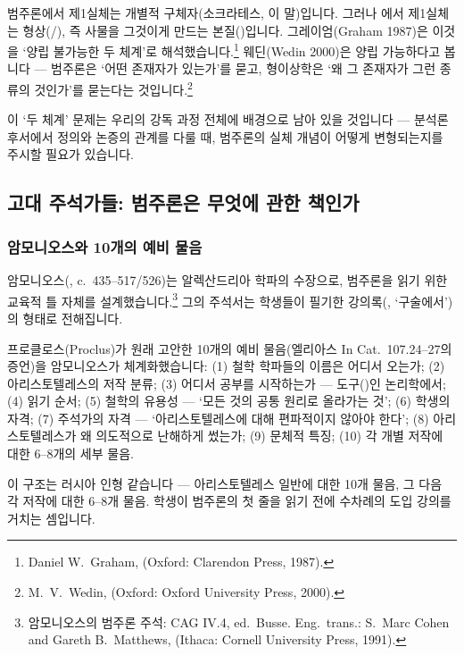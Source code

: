 \documentclass[12pt, a4paper]{article}
\begin{document}
범주론에서 제1실체는 개별적 구체자(소크라테스, 이 말)입니다. 그러나 에서 제1실체는 형상(/), 즉 사물을 그것이게 만드는 본질()입니다. 그레이엄(Graham 1987)은 이것을 `양립 불가능한 두 체계'로 해석했습니다.\footnote{Daniel W.\ Graham,  (Oxford: Clarendon Press, 1987).} 웨딘(Wedin 2000)은 양립 가능하다고 봅니다 --- 범주론은 `어떤 존재자가 있는가'를 묻고, 형이상학은 `왜 그 존재자가 그런 종류의 것인가'를 묻는다는 것입니다.\footnote{M.\ V.\ Wedin,  (Oxford: Oxford University Press, 2000).}

이 `두 체계' 문제는 우리의 강독 과정 전체에 배경으로 남아 있을 것입니다 --- 분석론 후서에서 정의와 논증의 관계를 다룰 때, 범주론의 실체 개념이 어떻게 변형되는지를 주시할 필요가 있습니다.

\subsection{고대 주석가들: 범주론은 무엇에 관한 책인가}

\subsubsection{암모니오스와 10개의 예비 물음}

암모니오스(, c.\ 435--517/526)는 알렉산드리아 학파의 수장으로, 범주론을 읽기 위한 교육적 틀 자체를 설계했습니다.\footnote{암모니오스의 범주론 주석: CAG IV.4, ed.\ Busse. Eng.\ trans.: S.\ Marc Cohen and Gareth B.\ Matthews,  (Ithaca: Cornell University Press, 1991).} 그의 주석서는 학생들이 필기한 강의록(, `구술에서')의 형태로 전해집니다.

프로클로스(Proclus)가 원래 고안한 10개의 예비 물음(엘리아스 In Cat.\ 107.24--27의 증언)을 암모니오스가 체계화했습니다: (1) 철학 학파들의 이름은 어디서 오는가; (2) 아리스토텔레스의 저작 분류; (3) 어디서 공부를 시작하는가 --- 도구()인 논리학에서; (4) 읽기 순서; (5) 철학의 유용성 --- `모든 것의 공통 원리로 올라가는 것'; (6) 학생의 자격; (7) 주석가의 자격 --- `아리스토텔레스에 대해 편파적이지 않아야 한다'; (8) 아리스토텔레스가 왜 의도적으로 난해하게 썼는가; (9) 문체적 특징; (10) 각 개별 저작에 대한 6--8개의 세부 물음.

이 구조는 러시아 인형 같습니다 --- 아리스토텔레스 일반에 대한 10개 물음, 그 다음 각 저작에 대한 6--8개 물음. 학생이 범주론의 첫 줄을 읽기 전에 수차례의 도입 강의를 거치는 셈입니다.
\end{document}
